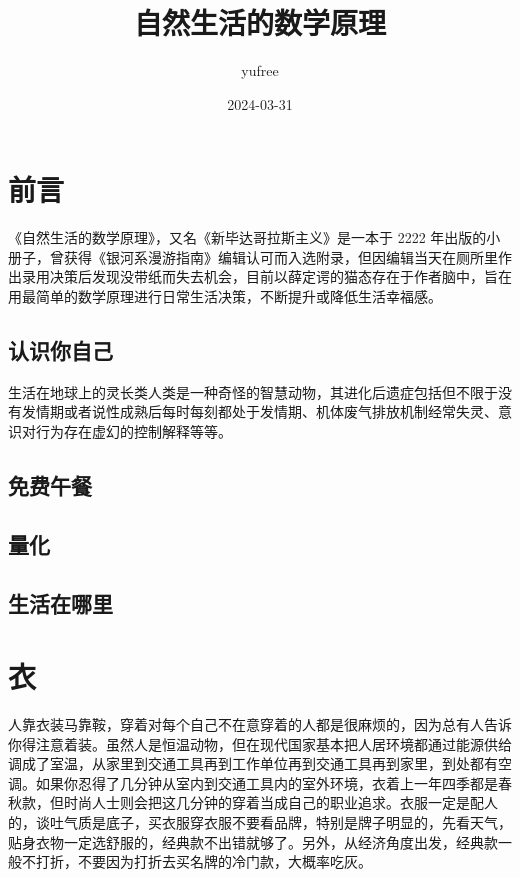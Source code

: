 \documentclass[
  letterpaper,
  DIV=11,
  numbers=noendperiod]{scrreprt}
\title{自然生活的数学原理}
\author{yufree}
\date{2024-03-31}
\renewcommand*\contentsname{Table of contents}
\newcommand\contentsname{Table of contents}
\begin{document}
\maketitle

\renewcommand*\contentsname{Table of contents}
{
\hypersetup{linkcolor=}
\setcounter{tocdepth}{2}
\tableofcontents
}

\chapter{前言}\label{ux524dux8a00}

《自然生活的数学原理》，又名《新毕达哥拉斯主义》是一本于 2222
年出版的小册子，曾获得《银河系漫游指南》编辑认可而入选附录，但因编辑当天在厕所里作出录用决策后发现没带纸而失去机会，目前以薛定谔的猫态存在于作者脑中，旨在用最简单的数学原理进行日常生活决策，不断提升或降低生活幸福感。

\section{认识你自己}\label{ux8ba4ux8bc6ux4f60ux81eaux5df1}

生活在地球上的灵长类人类是一种奇怪的智慧动物，其进化后遗症包括但不限于没有发情期或者说性成熟后每时每刻都处于发情期、机体废气排放机制经常失灵、意识对行为存在虚幻的控制解释等等。

\section{免费午餐}\label{ux514dux8d39ux5348ux9910}

\section{量化}\label{ux91cfux5316}

\section{生活在哪里}\label{ux751fux6d3bux5728ux54eaux91cc}


\chapter{衣}\label{ux8863}

人靠衣装马靠鞍，穿着对每个自己不在意穿着的人都是很麻烦的，因为总有人告诉你得注意着装。虽然人是恒温动物，但在现代国家基本把人居环境都通过能源供给调成了室温，从家里到交通工具再到工作单位再到交通工具再到家里，到处都有空调。如果你忍得了几分钟从室内到交通工具内的室外环境，衣着上一年四季都是春秋款，但时尚人士则会把这几分钟的穿着当成自己的职业追求。衣服一定是配人的，谈吐气质是底子，买衣服穿衣服不要看品牌，特别是牌子明显的，先看天气，贴身衣物一定选舒服的，经典款不出错就够了。另外，从经济角度出发，经典款一般不打折，不要因为打折去买名牌的冷门款，大概率吃灰。
\end{document}
